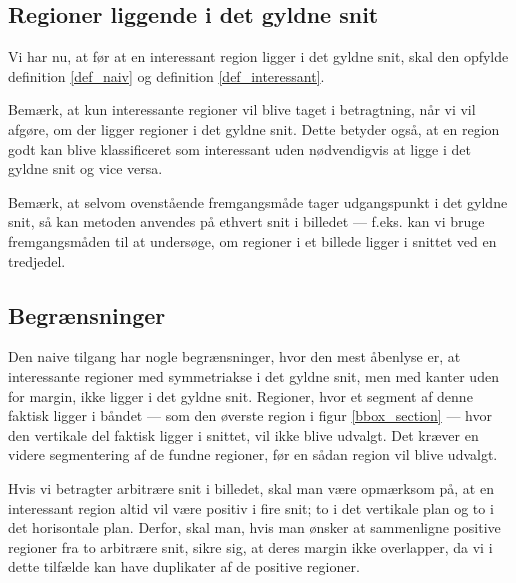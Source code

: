 {\subsection{Regioner liggende i det gyldne snit}
Vi har nu, at før at en interessant region ligger i det gyldne snit,
skal den opfylde definition \ref{def_naiv} og definition
\ref{def_interessant}.

Bemærk, at kun interessante regioner vil blive taget i betragtning, når
vi vil afgøre, om der ligger regioner i det gyldne snit. Dette betyder
også, at en region godt kan blive klassificeret som interessant uden
nødvendigvis at ligge i det gyldne snit og vice versa.

Bemærk, at selvom ovenstående fremgangsmåde tager udgangspunkt i det
gyldne snit, så kan metoden anvendes på ethvert snit i billedet ---
f.eks. kan vi bruge fremgangsmåden til at undersøge, om regioner i et
billede ligger i snittet ved en tredjedel.

\subsection{Begrænsninger}
Den naive tilgang har nogle begrænsninger, hvor den mest åbenlyse er, at
interessante regioner med symmetriakse i det gyldne snit, men med kanter
uden for margin, ikke ligger i det gyldne snit.  Regioner, hvor et
segment af denne faktisk ligger i båndet --- som den øverste region i
figur \ref{bbox_section} --- hvor den vertikale del faktisk ligger i
snittet, vil ikke blive udvalgt.  Det kræver en videre segmentering af
de fundne regioner, før en sådan region vil blive udvalgt.

Hvis vi betragter arbitrære snit i billedet, skal man være opmærksom på,
at en interessant region altid vil være positiv i fire snit; to i det
vertikale plan og to i det horisontale plan. Derfor, skal man, hvis man
ønsker at sammenligne positive regioner fra to arbitrære snit, sikre
sig, at deres margin ikke overlapper, da vi i dette tilfælde kan have
duplikater af de positive regioner.

}

